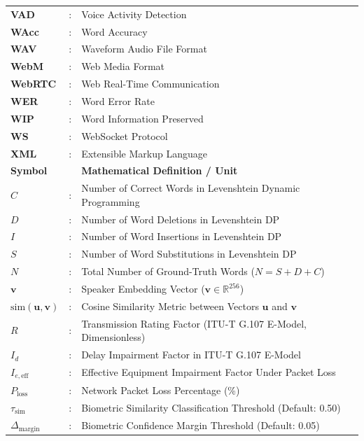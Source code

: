 \documentclass[12pt,oneside,letterpaper]{report}
\numberwithin{equation}{chapter} %
\begin{document}
\begin{longtable}{p{3.0cm}p{0.5cm}p{10.5cm}}
\textbf{VAD} & : & Voice Activity Detection \\
\textbf{WAcc} & : & Word Accuracy \\
\textbf{WAV} & : & Waveform Audio File Format \\
\textbf{WebM} & : & Web Media Format \\
\textbf{WebRTC} & : & Web Real-Time Communication \\
\textbf{WER} & : & Word Error Rate \\
\textbf{WIP} & : & Word Information Preserved \\
\textbf{WS} & : & WebSocket Protocol \\
\textbf{XML} & : & Extensible Markup Language \\
\midrule
\textbf{Symbol} & & \textbf{Mathematical Definition / Unit} \\
\midrule
$C$ & : & Number of Correct Words in Levenshtein Dynamic Programming \\
$D$ & : & Number of Word Deletions in Levenshtein DP \\
$I$ & : & Number of Word Insertions in Levenshtein DP \\
$S$ & : & Number of Word Substitutions in Levenshtein DP \\
$N$ & : & Total Number of Ground-Truth Words ($N = S + D + C$) \\
$\mathbf{v}$ & : & Speaker Embedding Vector ($\mathbf{v} \in \mathbb{R}^{256}$) \\
$\text{sim}(\mathbf{u}, \mathbf{v})$ & : & Cosine Similarity Metric between Vectors $\mathbf{u}$ and $\mathbf{v}$ \\
$R$ & : & Transmission Rating Factor (ITU-T G.107 E-Model, Dimensionless) \\
$I_d$ & : & Delay Impairment Factor in ITU-T G.107 E-Model \\
$I_{e,\text{eff}}$ & : & Effective Equipment Impairment Factor Under Packet Loss \\
$P_{\text{loss}}$ & : & Network Packet Loss Percentage (\%) \\
$\tau_{\text{sim}}$ & : & Biometric Similarity Classification Threshold (Default: 0.50) \\
$\Delta_{\text{margin}}$ & : & Biometric Confidence Margin Threshold (Default: 0.05) \\
\bottomrule
\end{longtable}

\newpage
{}
\setcounter{page}{1}
\end{document}
